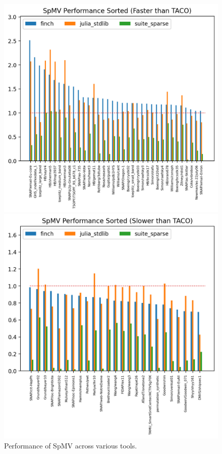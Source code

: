 \begin{figure}
    \begin{minipage}[t]{0.5\textwidth}
        \vspace{0pt} %
        \includegraphics[width=\linewidth]{spmv_performance_sorted_(faster_than_taco).png}
    \end{minipage}%
    \begin{minipage}[t]{0.5\textwidth}
        \vspace{0pt} %
        \includegraphics[width=\linewidth]{spmv_performance_sorted_(slower_than_taco).png}
    \end{minipage}
    \caption{Performance of SpMV across various tools.}
\end{figure}

